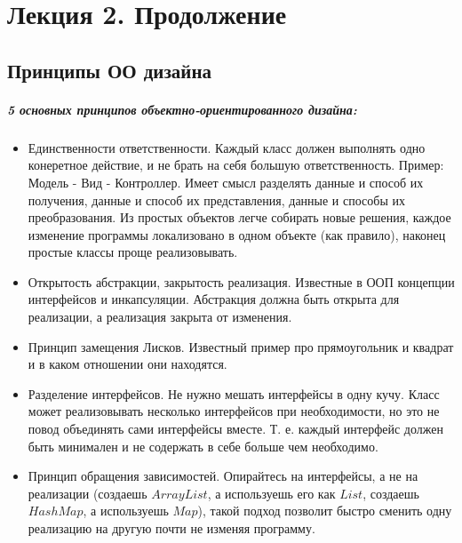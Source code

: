 \chapter{Лекция 2. Продолжение}

\section{Принципы ОО дизайна}

\paragraph{5 основных принципов объектно-ориентированного дизайна:}

\begin{itemize}
\item Единственности ответственности. Каждый класс должен выполнять одно конеретное действие, и не брать на себя большую ответственность.
Пример: Модель - Вид - Контроллер. Имеет смысл разделять данные и способ их получения, данные и способ их представления, данные и способы их преобразования. Из
простых объектов легче собирать новые решения, каждое изменение программы локализовано в одном объекте (как правило), наконец простые классы проще реализовывать.

\item Открытость абстракции, закрытость реализация. Известные в ООП концепции интерфейсов и инкапсуляции. Абстракция должна быть открыта для реализации, а реализация
закрыта от изменения.

\item Принцип замещения Лисков. Известный пример про прямоугольник и квадрат и в каком отношении они находятся.

\item Разделение интерфейсов. Не нужно мешать интерфейсы в одну кучу. Класс может реализовывать несколько интерфейсов при необходимости, но это не повод объединять
сами интерфейсы вместе. Т. е. каждый интерфейс должен быть минимален и не содержать в себе больше чем необходимо.

\item Принцип обращения зависимостей. Опирайтесь на интерфейсы, а не на реализации (создаешь $ArrayList$, а используешь его как $List$, создаешь $HashMap$, а
используешь $Map$), такой подход позволит быстро сменить одну реализацию на другую почти не изменяя программу.
\end{itemize}